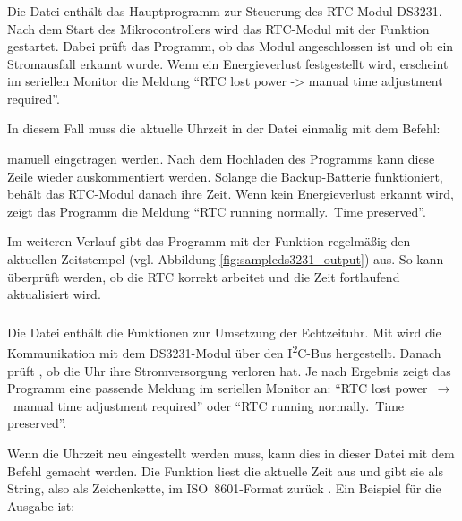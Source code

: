 \subsubsection*{}

Die Datei  enthält das Hauptprogramm zur Steuerung des RTC-Modul DS3231. 
Nach dem Start des Mikrocontrollers wird das RTC-Modul mit der Funktion  gestartet. 
Dabei prüft das Programm, ob das Modul angeschlossen ist und ob ein Stromausfall erkannt wurde. 
Wenn ein Energieverlust festgestellt wird, erscheint im seriellen Monitor die Meldung 
\enquote{RTC lost power -> manual time adjustment required}.

In diesem Fall muss die aktuelle Uhrzeit in der Datei  
einmalig mit dem Befehl:
\begin{center}
\end{center}
manuell eingetragen werden. 
Nach dem Hochladen des Programms kann diese Zeile wieder auskommentiert werden. 
Solange die Backup-Batterie funktioniert, behält das RTC-Modul danach ihre Zeit. 
Wenn kein Energieverlust erkannt wird, zeigt das Programm die Meldung 
\enquote{RTC running normally.~Time preserved}.

Im weiteren Verlauf gibt das Programm mit der Funktion  
regelmäßig den aktuellen Zeitstempel (vgl. Abbildung \ref{fig:sampleds3231_output}) aus. 
So kann überprüft werden, ob die RTC korrekt arbeitet und die Zeit fortlaufend aktualisiert wird.

\subsubsection*{}
Die Datei  enthält die Funktionen zur Umsetzung der Echtzeituhr. 
Mit  wird die Kommunikation mit dem DS3231-Modul über den I\textsuperscript{2}C-Bus hergestellt.
Danach prüft , ob die Uhr ihre Stromversorgung verloren hat. 
Je nach Ergebnis zeigt das Programm eine passende Meldung im seriellen Monitor an: 
\enquote{RTC lost power~$\rightarrow$~manual time adjustment required} 
oder 
\enquote{RTC running normally.~Time preserved}.

Wenn die Uhrzeit neu eingestellt werden muss, kann dies in dieser Datei 
mit dem Befehl  gemacht werden. 
Die Funktion  liest die aktuelle Zeit aus 
und gibt sie als String, also als Zeichenkette, im ISO~8601-Format zurück \cite{ISO8601:2019} . 
Ein Beispiel für die Ausgabe ist:


